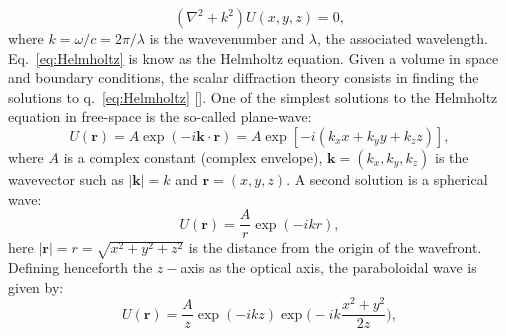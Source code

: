 \begin{refsection}
\begin{equation}\label{eq:Helmholtz}
    (\nabla^2 + k^2)U(x,y,z) = 0,
\end{equation}
where $k=\omega/c=2\pi/\lambda$ is the wavevenumber and $\lambda$, the associated wavelength. Eq.~\ref{eq:Helmholtz} is know as the Helmholtz equation. Given a volume in space and boundary conditions, the scalar diffraction theory consists in finding the solutions to q.~\ref{eq:Helmholtz} [\cite[\textit{§1.2}]{Paganin2006}]. One of the simplest solutions to the Helmholtz equation in free-space is the so-called plane-wave:
\begin{equation}\label{eq:planewave}
    U(\textbf{r}) = A\exp(-i\textbf{k}\cdot\textbf{r})=A\exp[-i(k_xx+k_yy+k_zz)],
\end{equation}
where $A$ is a complex constant (complex envelope), $\textbf{k}=(k_x, k_y, k_z)$ is the wavevector such as $\vert\textbf{k}\vert=k$ and $\textbf{r}=(x,y,z)$. A second solution is a spherical wave:
\begin{equation}\label{eq:spherical}
    U(\textbf{r}) = \frac{A}{r}\exp(-ikr),
\end{equation}
here  $\vert\textbf{r}\vert=r=\sqrt{x^2 + y^2 +z^2}$ is the distance from the origin of the wavefront.
Defining henceforth the $z-$axis as the optical axis, the paraboloidal wave is given by:
\begin{equation}\label{eq:parabolic}
    U(\textbf{r}) = \frac{A}{z}\exp(-ikz)\exp{\Bigg(-ik\frac{x^2 + y^2}{2z}\Bigg)},
\end{equation}

\end{refsection}
